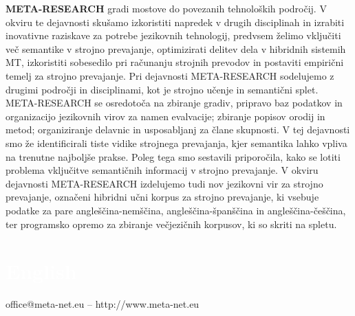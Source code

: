 \begin{multicols}{2}
\textbf{META-RESEARCH} gradi mostove do povezanih tehnoloških področij. V okviru te dejavnosti skušamo izkoristiti napredek v drugih disciplinah in izrabiti inovativne raziskave za potrebe jezikovnih tehnologij, predvsem želimo vključiti več semantike v strojno prevajanje, optimizirati delitev dela v hibridnih sistemih MT, izkoristiti sobesedilo pri računanju strojnih prevodov in postaviti empirični temelj za strojno prevajanje. Pri dejavnosti META-RESEARCH sodelujemo z drugimi področji in disciplinami, kot je strojno učenje in semantični splet. META-RESEARCH se osredotoča na zbiranje gradiv, pripravo baz podatkov in organizacijo jezikovnih virov za namen evalvacije; zbiranje popisov orodij in metod; organiziranje delavnic in usposabljanj za člane skupnosti. V tej dejavnosti smo že identificirali tiste vidike strojnega prevajanja, kjer semantika lahko vpliva na trenutne najboljše prakse. Poleg tega smo sestavili priporočila, kako se lotiti problema vključitve semantičnih informacij v strojno prevajanje. V okviru dejavnosti META-RESEARCH izdelujemo tudi nov jezikovni vir za strojno prevajanje, označeni hibridni učni korpus za strojno prevajanje, ki vsebuje podatke za pare angleščina-nemščina, angleščina-španščina in angleščina-češčina, ter programsko opremo za zbiranje večjezičnih korpusov, ki so skriti na spletu.

\end{multicols}

\vfill

\makeatletter
{}
{
  \renewcommand*{\theHsection}{\thepart.\thesection}
}
\makeatother
\part*{\textcolor{white}{English}}
\setcounter{section}{0}
\setcounter{figure}{0}

\centerline{office@meta-net.eu -- http://www.meta-net.eu}


\cleardoublepage



